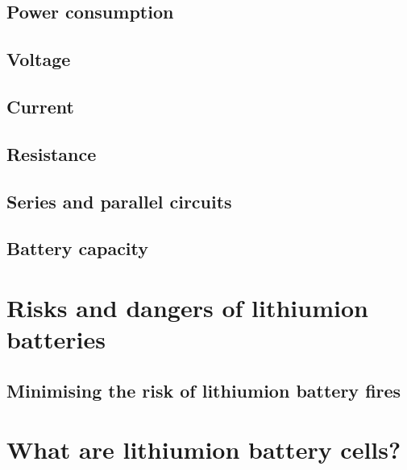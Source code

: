 \documentclass[letterpaper,10pt,english]{sphinxmanual}
\begin{document}
\section{Power consumption}
\label{\detokenize{basic_concepts:power-consumption}}

\section{Voltage}
\label{\detokenize{basic_concepts:voltage}}

\section{Current}
\label{\detokenize{basic_concepts:current}}

\section{Resistance}
\label{\detokenize{basic_concepts:resistance}}

\section{Series and parallel circuits}
\label{\detokenize{basic_concepts:series-and-parallel-circuits}}

\section{Battery capacity}
\label{\detokenize{basic_concepts:battery-capacity}}

\chapter{Risks and dangers of lithium\sphinxhyphen{}ion batteries}
\label{\detokenize{risks_and_dangers_of_lithium-ion_batteries:risks-and-dangers-of-lithium-ion-batteries}}\label{\detokenize{risks_and_dangers_of_lithium-ion_batteries::doc}}

\section{Minimising the risk of lithium\sphinxhyphen{}ion battery fires}
\label{\detokenize{risks_and_dangers_of_lithium-ion_batteries:minimising-the-risk-of-lithium-ion-battery-fires}}

\chapter{What are lithium\sphinxhyphen{}ion battery cells?}
\label{\detokenize{what_are_lithium-ion_battery_cells:what-are-lithium-ion-battery-cells}}\label{\detokenize{what_are_lithium-ion_battery_cells::doc}}
\end{document}
